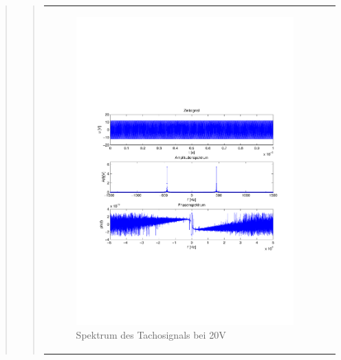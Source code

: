 \begin{quote}
\begin{quote}
\begin{center}
\begin{tabular}{ll}
\begin{minipage}{0.6\textwidth}
                    \end{minipage}
                    \begin{minipage}{0.6\textwidth}
    
                        \begin{figure}[H]
                            \label{fig:}
                            \includegraphics[scale=0.45, trim = 0.8cm 7cm 3cm
                            8.5cm,
                            clip]{./Bilder/Termin7/ampl_spektrum_messung2_tacho}
                            \caption{Spektrum des Tachosignals bei 20V}
                        \end{figure}
                    \vspace{-1.5em}
    
                    \end{minipage}
    

\end{tabular}
\end{center}
\end{quote}
\end{quote}
